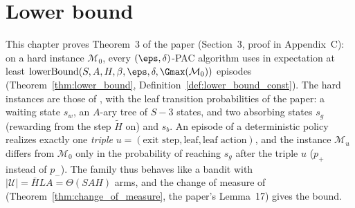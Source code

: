 \chapter{Lower bound}
\label{chap:lower_bound}

This chapter proves Theorem~3 of the paper (Section~3, proof in Appendix~C): on a hard
instance $\mathcal M_0$, every $(\eps,\delta)$-PAC algorithm uses in expectation at least
$\mathrm{lowerBound}(S,A,H,\beta,\eps,\delta,\Gmax(\mathcal M_0))$ episodes
(Theorem~\ref{thm:lower_bound}, Definition~\ref{def:lower_bound_const}). The hard instances are
those of \cite{domingues2021episodic}, with the leaf transition probabilities of the paper: a
waiting state $s_w$, an $A$-ary tree of $S - 3$ states, and two absorbing states $s_g$
(rewarding from the step $\tilde H$ on) and $s_b$. An episode of a deterministic policy
realizes exactly one \emph{triple} $u = (\text{exit step}, \text{leaf}, \text{leaf action})$, and
the instance $\mathcal M_u$ differs from $\mathcal M_0$ only in the probability of reaching $s_g$
after the triple $u$ ($p_+$ instead of $p_-$). The family thus behaves like a bandit with
$|\mathcal U| = \bar H L A = \Theta(SAH)$ arms, and the change of measure of
\cite[Lemma~1]{kaufmann2016complexity} (Theorem~\ref{thm:change_of_measure}, the paper's
Lemma~17) gives the bound.

